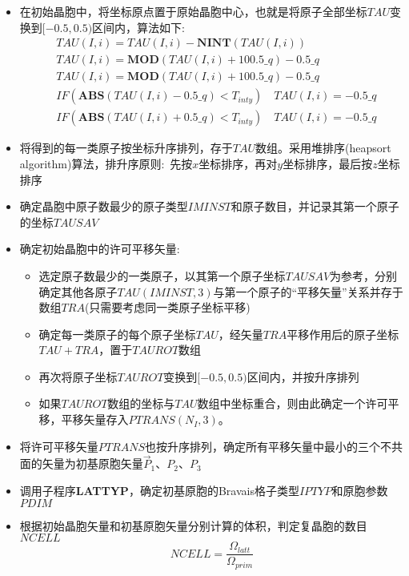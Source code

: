 \begin{itemize}
	\item 在初始晶胞中，将坐标原点置于原始晶胞中心，也就是将原子全部坐标$\mathit{TAU}$变换到$[-0.5,0.5)$区间内，算法如下:
			\begin{displaymath}
				\begin{aligned}
					&TAU(I,i)=TAU(I,i)-\mathbf{NINT}(TAU(I,i)) \\
					&TAU(I,i)=\mathbf{MOD}(TAU(I,i)+100.5\_q)-0.5\_q \\
					&TAU(I,i)=\mathbf{MOD}(TAU(I,i)+100.5\_q)-0.5\_q \\
					&IF (\mathbf{ABS}(TAU(I,i)-0.5\_q)<T_{inty})\quad TAU(I,i)=-0.5\_q \\
					&IF (\mathbf{ABS}(TAU(I,i)+0.5\_q)<T_{inty})\quad TAU(I,i)=-0.5\_q
				\end{aligned}
			\end{displaymath}
	\item 将得到的每一类原子按坐标升序排列，存于$\mathit{TAU}$数组。采用堆排序\textrm{(heapsort algorithm)}算法，排升序原则:~先按$x$坐标排序，再对$y$坐标排序，最后按$z$坐标排序
	\item 确定晶胞中原子数最少的原子类型$\mathit{IMINST}$和原子数目，并记录其第一个原子的坐标$\mathit{TAUSAV}$
	\item 确定初始晶胞中的许可平移矢量:~
		\begin{itemize}
			\item 选定原子数最少的一类原子，以其第一个原子坐标$\mathit{TAUSAV}$为参考，分别确定其他各原子$\mathit{TAU}(IMINST,3)$与第一个原子的“平移矢量”关系并存于数组$\mathit{TRA}$(只需要考虑同一类原子坐标平移)
			\item 确定每一类原子的每个原子坐标$\mathit{TAU}$，经矢量$\mathit{TRA}$平移作用后的原子坐标$\mathit{TAU}+\mathit{TRA}$，置于$\mathit{TAUROT}$数组
			\item 再次将原子坐标$\mathit{TAUROT}$变换到$[-0.5,0.5)$区间内，并按升序排列
			\item 如果$\mathit{TAUROT}$数组的坐标与$\mathit{TAU}$数组中坐标重合，则由此确定一个许可平移，平移矢量存入$\mathit{PTRANS}(N_I,3)$。
		\end{itemize}
	\item 将许可平移矢量$\mathit{PTRANS}$也按升序排列，确定所有平移矢量中最小的三个不共面的矢量为初基原胞矢量$\vec P_1$、$P_2$、$P_3$
	\item 调用子程序\textbf{LATTYP}，确定初基原胞的\textrm{Bravais}格子类型$\mathit{IPTYP}$和原胞参数$\mathit{PDIM}$
        \item 根据初始晶胞矢量和初基原胞矢量分别计算的体积，判定复晶胞的数目$\mathit{NCELL}$
\begin{displaymath}
	\mathit{NCELL}=\dfrac{\Omega_{latt}}{\Omega_{prim}}
\end{displaymath}
\end{itemize}

